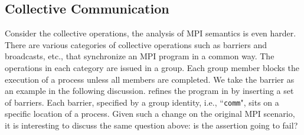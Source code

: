 \subsection{Collective Communication}

\examplefigoneB

Consider the collective operations, the analysis of MPI semantics is even harder. There are various categories of collective operations such as barriers and broadcasts, etc., that synchronize an MPI program in a common way. The operations in each category are issued in a group. Each group member blocks the execution of a process unless all members are completed. We take the barrier as an example in the following discussion.
 refines the program in  by inserting a set of barriers. Each barrier, specified by a group identity, i.e., ``\texttt{comm}", sits on a specific location of a process. 
Given such a change on the original MPI scenario, it is interesting to discuss the same question above: is the assertion going to fail?  

